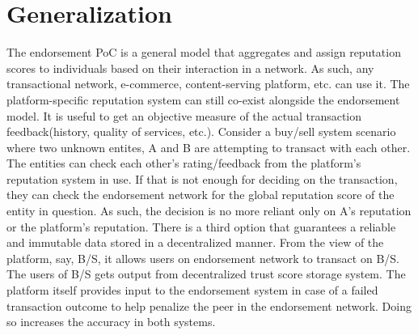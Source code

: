 \section{Generalization} \label{sec:generalization}
The endorsement PoC is a general model that aggregates and assign reputation
scores to individuals based on their interaction in a network. As such, any
transactional network, e-commerce, content-serving platform, etc. can use it.
The platform-specific reputation system can still co-exist alongside the
endorsement model. It is useful to get an objective measure of the actual
transaction feedback(history, quality of services, etc.).  Consider a buy/sell
system scenario where two unknown entites, A and B are attempting to transact
with each other. The entities can check each other's rating/feedback from the
platform's reputation system in use. If that is not enough for deciding on the
transaction, they can check the endorsement network for the global reputation
score of the entity in question. As such, the decision is no more reliant only
on A's reputation or the platform's reputation. There is a third option that
guarantees a reliable and immutable data stored in a decentralized manner. From
the view of the platform, say, B/S, it allows users on endorsement network to
transact on B/S. The users of B/S gets output from decentralized trust score
storage system. The platform itself provides input to the endorsement system in
case of a failed transaction outcome to help penalize the peer in the
endorsement network. Doing so increases the accuracy in both systems. 


